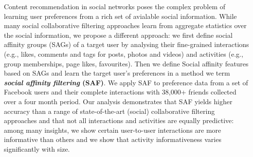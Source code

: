 Content recommendation in social networks poses the complex problem of
learning user preferences from a rich set of avialable social information.
While many social collaborative filtering approaches learn from aggregate statistics over the
social information, we propose a different approach: we first define
social affinity groups (SAGs) of a target user by analysing their
fine-grained interactions (e.g., likes, comments and tags for posts, photos and videos) 
and activities (e.g., group memberships, page likes, favourites).  Then we define Social 
affinity features based on SAGs and learn the target user's preferences
in a method we term \textbf{\textit{social affinity filtering} (SAF)}.
We apply SAF to preference data from a set of Facebook users and their
complete interactions with 38,000+ friends collected over a four month
period.
Our analysis demonstrates that SAF yields higher accuracy
than a range of state-of-the-art (social) collaborative filtering approaches and 
that not all interactions and activities are equally predictive: among many insights, 
we show certain user-to-user interactions are more
informative than others %
and we show that activity informativeness varies significantly with size.

